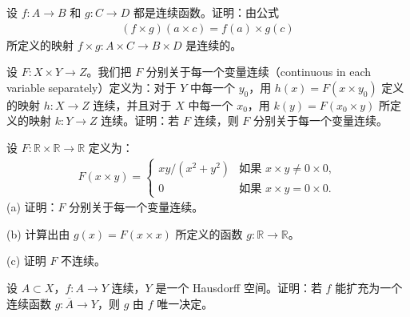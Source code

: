 \documentclass[../../main.tex]{subfiles}
\begin{document}
\begin{exercise}\label{exercise:ch02-连续函数-10}
设 $f: A \rightarrow B$ 和 $g: C \rightarrow D$ 都是连续函数。证明：由公式
\begin{align*}
(f \times g)(a \times c) = f(a) \times g(c)
\end{align*}
所定义的映射 $f \times g: A \times C \rightarrow B \times D$ 是连续的。
\end{exercise}

\begin{exercise}\label{exercise:ch02-连续函数-11}
设 $F: X \times Y \rightarrow Z$。我们把 $F$ 分别关于每一个变量连续（continuous in each variable separately）定义为：对于 $Y$ 中每一个 $y_{0}$，用 $h(x) = F(x \times y_{0})$ 定义的映射 $h: X \rightarrow Z$ 连续，并且对于 $X$ 中每一个 $x_{0}$，用 $k(y) = F(x_{0} \times y)$ 所定义的映射 $k: Y \rightarrow Z$ 连续。证明：若 $F$ 连续，则 $F$ 分别关于每一个变量连续。
\end{exercise}

\begin{exercise}\label{exercise:ch02-连续函数-12}
设 $F: \mathbb{R} \times \mathbb{R} \rightarrow \mathbb{R}$ 定义为：
\begin{align*}
F(x \times y) =
\begin{cases}
xy/(x^{2} + y^{2}) & \text{如果 } x \times y \neq 0 \times 0, \\
0 & \text{如果 } x \times y = 0 \times 0.
\end{cases}
\end{align*}
(a) 证明：$F$ 分别关于每一个变量连续。

(b) 计算出由 $g(x) = F(x \times x)$ 所定义的函数 $g: \mathbb{R} \rightarrow \mathbb{R}$。

(c) 证明 $F$ 不连续。
\end{exercise}

\begin{exercise}\label{exercise:ch02-连续函数-13}
设 $A \subset X$，$f: A \rightarrow Y$ 连续，$Y$ 是一个 Hausdorff 空间。证明：若 $f$ 能扩充为一个连续函数 $g: \overline{A} \rightarrow Y$，则 $g$ 由 $f$ 唯一决定。
\end{exercise}
\end{document}

